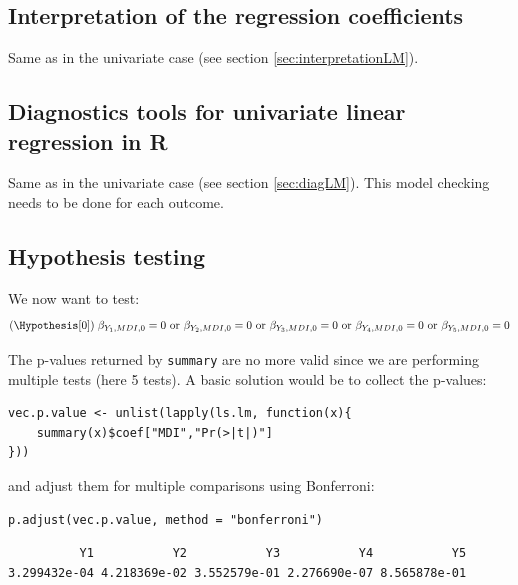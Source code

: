 \documentclass{article}
\newcommand\Rlogo{\textbf{\textsf{R}}}
\begin{document}
\subsection{Interpretation of the regression coefficients}
\label{sec:org744f64f}

Same as in the univariate case (see section \ref{sec:interpretationLM}).

\subsection{Diagnostics tools for univariate linear regression in \Rlogo{}}
\label{sec:orga17204e}

Same as in the univariate case (see section \ref{sec:diagLM}). This model
checking needs to be done for each outcome.

\subsection{Hypothesis testing}
\label{sec:orga039532}

We now want to test:
\begin{align*}
(\Hypothesis[0]) \; \beta_{Y_1, MDI, 0} = 0
 \text{ or } \beta_{Y_2, MDI, 0} = 0
 \text{ or } \beta_{Y_3, MDI, 0} = 0
 \text{ or } \beta_{Y_4, MDI, 0} = 0
 \text{ or } \beta_{Y_5, MDI, 0} = 0
\end{align*}

The p-values returned by \texttt{summary} are no more valid since we are
performing multiple tests (here 5 tests). A basic solution would be to
collect the p-values:
\lstset{language=r,label= ,caption= ,captionpos=b,numbers=none}
\begin{lstlisting}
vec.p.value <- unlist(lapply(ls.lm, function(x){
	summary(x)$coef["MDI","Pr(>|t|)"]
}))
\end{lstlisting}

\clearpage

and adjust them for multiple comparisons using Bonferroni:
\lstset{language=r,label= ,caption= ,captionpos=b,numbers=none}
\begin{lstlisting}
p.adjust(vec.p.value, method = "bonferroni")
\end{lstlisting}

\begin{verbatim}
          Y1           Y2           Y3           Y4           Y5 
3.299432e-04 4.218369e-02 3.552579e-01 2.276690e-07 8.565878e-01
\end{verbatim}
\end{document}
